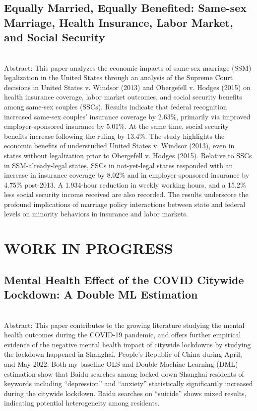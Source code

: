 \documentclass[a4paper,9pt]{extarticle}
\begin{document}
\subsection*{Equally Married, Equally Benefited: Same-sex Marriage, Health Insurance, Labor Market, and Social Security} \\ 
Abstract: This paper analyzes the economic impacts of same-sex marriage (SSM) legalization in the United States through an analysis of the Supreme Court decisions in United States v. Windsor (2013) and Obergefell v. Hodges (2015) on health insurance coverage, labor market outcomes, and social security benefits among same-sex couples (SSCs). Results indicate that federal recognition increased same-sex couples’ insurance coverage by 2.63\%, primarily via improved employer-sponsored insurance by 5.01\%. At the same time, social security benefits increase following the ruling by 13.4\%. The study highlights the economic benefits of understudied United States v. Windsor (2013), even in states without legalization prior to Obergefell v. Hodges (2015). Relative to SSCs in SSM-already-legal states, SSCs in not-yet-legal states responded with an increase in insurance coverage by 8.02\% and in employer-sponsored insurance by 4.75\% post-2013. A 1.934-hour reduction in weekly working hours, and a 15.2\% less social security income received are also recorded. The results underscore the profound implications of marriage policy interactions between state and federal levels on minority behaviors in insurance and labor markets. \\


\section*{WORK IN PROGRESS}

\subsection*{Mental Health Effect of the COVID Citywide Lockdown: A Double ML Estimation} \\ 

Abstract: This paper contributes to the growing literature studying the mental health outcomes during the COVID-19 pandemic, and offers further empirical evidence of the negative mental health impact of citywide lockdowns by studying the lockdown happened in Shanghai, People’s Republic of China during April, and May 2022. Both my baseline OLS and Double Machine Learning (DML) estimation show that Baidu searches among locked down Shanghai residents of keywords including “depression” and “anxiety” statistically significantly increased during the citywide lockdown. Baidu searches on “suicide” shows mixed results, indicating potential heterogeneity among residents. \\
\end{document}

